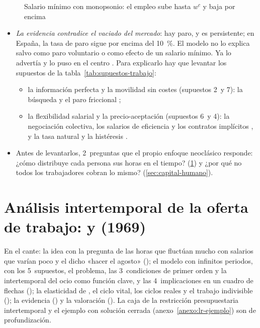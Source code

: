 \documentclass[11pt]{article}
\begin{document}
\begin{figure}[H]
\centering
\caption{Salario mínimo con monopsonio: el empleo sube hasta $w^c$ y baja por encima}\label{fig:salario-minimo}
\end{figure}

\begin{itemize}
\item \emph{La evidencia contradice el vaciado del mercado}: hay paro, y es persistente; en España, la tasa de paro sigue por encima del 10~\%\nocite{INE2026EPA3T}. El modelo no lo explica salvo como paro voluntario o como efecto de un salario mínimo. Ya lo advertía  y lo puso en el centro  . Para explicarlo hay que levantar los supuestos de la tabla~\ref{tab:supuestos-trabajo}:
  \begin{itemize}
  \item la información perfecta y la movilidad sin costes (supuestos 2~y 7): la búsqueda y el paro friccional ;
  \item la flexibilidad salarial y la precio-aceptación (supuestos 6~y 4): la negociación colectiva, los salarios de eficiencia y los contratos implícitos , y la tasa natural y la histéresis .
  \end{itemize}
\item Antes de levantarlos, 2~preguntas que el propio enfoque neoclásico responde: ¿cómo distribuye cada persona sus horas en el tiempo? (\ref{sec:intertemporal}) y ¿por qué no todos los trabajadores cobran lo mismo? (\ref{sec:capital-humano}).
\end{itemize}


\section{Análisis intertemporal de la oferta\cortetitulo{} de trabajo:  y  (1969)}\label{sec:intertemporal}

\begin{notaopositor}
En el cante: la idea con la pregunta de las horas que fluctúan mucho con salarios que varían poco y el dicho «hacer el agosto» (); el modelo con infinitos periodos, con los 5~supuestos, el problema, las 3~condiciones de primer orden y la intertemporal del ocio como función clave, y las 4~implicaciones en un cuadro de flechas (); la elasticidad de , el ciclo vital, los ciclos reales y el trabajo indivisible (); la evidencia () y la valoración (). La caja de la restricción presupuestaria intertemporal y el ejemplo con solución cerrada (anexo~\ref{anexo:lr-ejemplo}) son de profundización.
\end{notaopositor}
\end{document}
